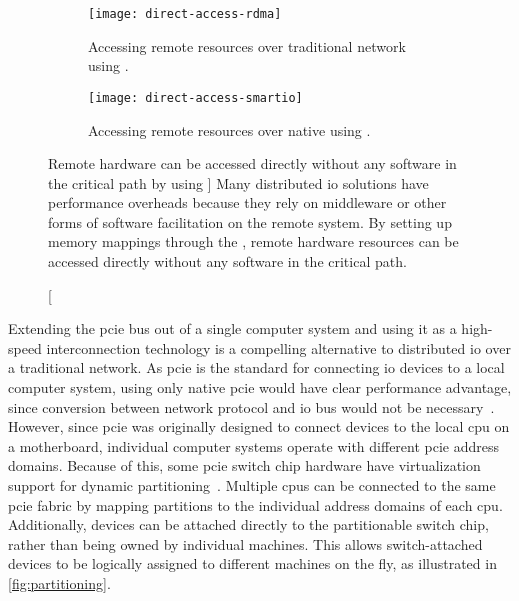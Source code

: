 \begin{figure}
    \centering
    \begin{subfigure}{\linewidth}
        \centering
        \texttt{[image: direct-access-rdma]}
        \caption{Accessing remote resources over traditional network using .}
    \end{subfigure}
    \par\vspace{5mm}
    \begin{subfigure}{\linewidth}
        \centering
        \texttt{[image: direct-access-smartio]}
        \caption{Accessing remote resources over native  using .}
    \end{subfigure}
    \caption
    [Remote hardware can be accessed directly without any software in the critical path by using ]
    {Many distributed \gls{io} solutions have performance overheads because they rely on \gls{middleware} or other forms of software facilitation on the remote system. By setting up memory mappings through the , remote hardware resources can be accessed directly without any software in the critical path.}
    \label{fig:direct-access}
\end{figure}



Extending the \gls{pcie} bus out of a single computer system and using it as a high-speed interconnection technology is a compelling alternative to distributed \gls{io} over a traditional network.
%
As \gls{pcie} is the standard for connecting \gls{io} devices to a local computer system, using only native \gls{pcie} would have clear performance advantage, since conversion between network protocol and \gls{io} bus would not be necessary~\cite{Fountain2005,Ravindran2008,whitepaper:Regula2004}.
%
However, since \gls{pcie} was originally designed to connect devices to the local \gls{cpu} on a motherboard, individual computer systems operate with different \gls{pcie} address domains.
%
Because of this, some \gls{pcie} switch chip hardware have virtualization support for dynamic partitioning~\cite{Chung2018,whitepaper:IDT,whitepaper:Microsemi,url:rackscale,url:liqid,url:gigaio}. 
%
Multiple \glspl{cpu} can be connected to the same \gls{pcie} fabric by mapping partitions to the individual address domains of each \gls{cpu}.
%
Additionally, devices can be attached directly to the partitionable switch chip, rather than being owned by individual machines.
%
This allows switch-attached devices to be logically assigned to different machines on the fly, as illustrated in \cref{fig:partitioning}.


